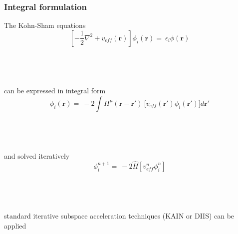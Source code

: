 \documentclass[mathserif, 8pt]{beamer}
\begin{document}
\begin{frame}
    \frametitle{Integral formulation}
    \centering
    The Kohn-Sham equations
    \begin{equation}
	\nonumber
	\left[-\frac{1}{2}\nabla^2 + v_{eff}(\boldsymbol{r})\right]
	\phi_i(\boldsymbol{r}) =\ \epsilon_i \phi(\boldsymbol{r})
    \end{equation}
    \ \\
    \ \\
    \ \\
    \ \\
    \pause
    can be expressed in integral form
    \begin{equation}
	\nonumber
	\phi_i(\boldsymbol{r}) =\ -2\int H^{\mu}(\boldsymbol{r}-\boldsymbol{r}')\
	    \Big[v_{eff}(\boldsymbol{r}') \phi_i(\boldsymbol{r}')\Big] d\boldsymbol{r}'
    \end{equation}
    \ \\
    \ \\
    \ \\
    \ \\
    \pause
    and solved iteratively
    \begin{equation}
	\nonumber
	\phi_i^{n+1} =\ -2\hat{H}\left[v_{eff}^n\phi_i^n\right]
    \end{equation}
    \ \\
    \ \\
    \ \\
    \ \\
    standard iterative subspace acceleration techniques (KAIN or DIIS) can be applied
\end{frame}
\end{document}
